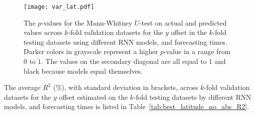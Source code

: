 \begin{figure}[!ht]
	\centering
	\texttt{[image: var\_lat.pdf]}
	\caption{The $p$-values for the Mann-Whitney $U$-test on actual and predicted values across $k$-fold validation datasets for the $y$ offset in the $k$-fold testing datasets using different RNN models, and forecasting times. Darker colors in grayscale represent a higher $p$-value in a range from $0$ to $1$. The values on the secondary diagonal are all equal to $1$ and black because models equal themselves.}
	\label{fig:var_lat}
\end{figure}

The average $R^{2}$ (\%), with standard deviation in brackets, across $k$-fold validation datasets for the $y$ offset estimated on the $k$-fold testing datasets by different RNN models, and forecasting times is listed in Table~\ref{tab:best_latitude_no_abs_R2}.

\begin{table}[!ht]
	\centering
	\caption{The average $R^{2}$ (\%), with standard deviation in brackets, across $k$-fold validation datasets for the $y$ offset estimated on the $k$-fold testing datasets by different RNN models, and forecasting times.}
	\label{tab:best_latitude_no_abs_R2}
\end{table}

